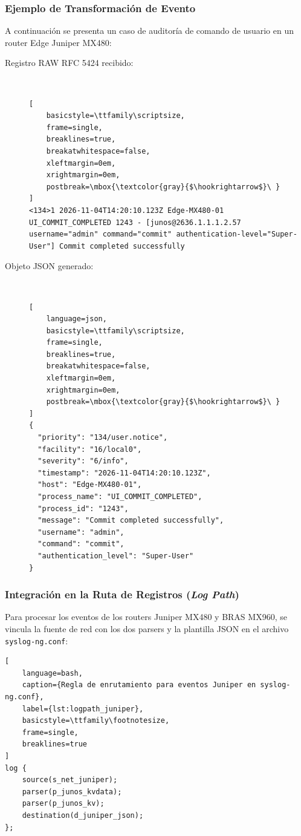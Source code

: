 \subsubsection{Ejemplo de Transformación de Evento}

A continuación se presenta un caso de auditoría de comando de usuario en un router Edge Juniper MX480:

\begin{description}
    \item[Registro RAW RFC 5424 recibido:] ~\\
\begin{lstlisting}[
    basicstyle=\ttfamily\scriptsize,
    frame=single,
    breaklines=true,
    breakatwhitespace=false,
    xleftmargin=0em,
    xrightmargin=0em,
    postbreak=\mbox{\textcolor{gray}{$\hookrightarrow$}\ }
]
<134>1 2026-11-04T14:20:10.123Z Edge-MX480-01 UI_COMMIT_COMPLETED 1243 - [junos@2636.1.1.1.2.57 username="admin" command="commit" authentication-level="Super-User"] Commit completed successfully
\end{lstlisting}

    \item[Objeto JSON generado:] ~\\
\begin{lstlisting}[
    language=json,
    basicstyle=\ttfamily\scriptsize,
    frame=single,
    breaklines=true,
    breakatwhitespace=false,
    xleftmargin=0em,
    xrightmargin=0em,
    postbreak=\mbox{\textcolor{gray}{$\hookrightarrow$}\ }
]
{
  "priority": "134/user.notice",
  "facility": "16/local0",
  "severity": "6/info",
  "timestamp": "2026-11-04T14:20:10.123Z",
  "host": "Edge-MX480-01",
  "process_name": "UI_COMMIT_COMPLETED",
  "process_id": "1243",
  "message": "Commit completed successfully",
  "username": "admin",
  "command": "commit",
  "authentication_level": "Super-User"
}
\end{lstlisting}
\end{description}

\subsubsection{Integración en la Ruta de Registros (\textit{Log Path})}

Para procesar los eventos de los routers Juniper MX480 y BRAS MX960, se vincula la fuente de red con los dos parsers y la plantilla JSON en el archivo \texttt{syslog-ng.conf}:

\begin{lstlisting}[
    language=bash,
    caption={Regla de enrutamiento para eventos Juniper en syslog-ng.conf},
    label={lst:logpath_juniper},
    basicstyle=\ttfamily\footnotesize,
    frame=single,
    breaklines=true
]
log {
    source(s_net_juniper);
    parser(p_junos_kvdata);
    parser(p_junos_kv);
    destination(d_juniper_json);
};
\end{lstlisting}

